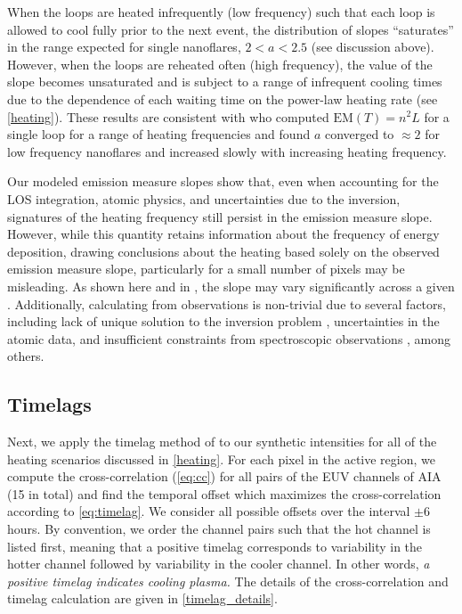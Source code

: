 When the loops are heated infrequently (low frequency) such that each loop is allowed to cool fully prior to the next event, the distribution of slopes ``saturates'' in the range expected for single nanoflares, $2<a<2.5$ (see discussion above). However, when the loops are reheated often (high frequency), the value of the slope becomes unsaturated and is subject to a range of infrequent cooling times due to the dependence of each waiting time on the power-law heating rate (see \autoref{heating}). These results are consistent with \citet{cargill_active_2014} who computed $\mathrm{EM}(T)=n^2L$ for a single loop for a range of heating frequencies and found $a$ converged to $\approx2$ for low frequency nanoflares and increased slowly with increasing heating frequency. 

Our modeled emission measure slopes show that, even when accounting for the LOS integration, atomic physics, and uncertainties due to the \dem{} inversion, signatures of the heating frequency still persist in the emission measure slope. However, while this quantity retains information about the frequency of energy deposition, drawing conclusions about the heating based solely on the observed emission measure slope, particularly for a small number of pixels may be misleading. As shown here and in \citet{del_zanna_evolution_2015}, the slope may vary significantly across a given \AR{}. Additionally, calculating \dem{} from observations is non-trivial due to several factors, including lack of unique solution to the inversion problem \citep[e.g.][]{aschwanden_benchmark_2015}, uncertainties in the atomic data, and insufficient constraints from spectroscopic observations \citep[e.g.][]{landi_isothermality_2010,winebarger_defining_2012}, among others. 

\subsection{Timelags}\label{timelags}

Next, we apply the timelag method of \citet{viall_evidence_2012} to our synthetic intensities for all of the heating scenarios discussed in \autoref{heating}. For each pixel in the active region, we compute the cross-correlation (\autoref{eq:cc}) for all pairs of the EUV channels of AIA (15 in total) and find the temporal offset which maximizes the cross-correlation according to \autoref{eq:timelag}. We consider all possible offsets over the interval $\pm6$ hours. By convention, we order the channel pairs such that the hot channel is listed first, meaning that a positive timelag corresponds to variability in the hotter channel followed by variability in the cooler channel. In other words, \textit{a positive timelag indicates cooling plasma.} The details of the cross-correlation and timelag calculation are given in \autoref{timelag_details}.

